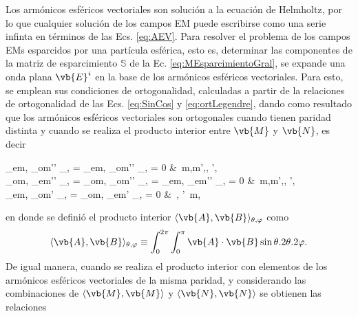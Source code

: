 Los armónicos esféricos vectoriales son solución a la ecuación de Helmholtz, por lo que cualquier solución de los campos EM puede escribirse como una serie infinta en términos de las Ecs. \eqref{eq:AEV}. Para resolver el problema de los campos EMs esparcidos por una partícula esférica, esto es, determinar las componentes de la matriz de esparcimiento $\mathbb{S}$ de la Ec. \eqref{eq:MEsparcimientoGral}, se expande una onda plana $\vb{E}^i$ en la base de los armónicos esféricos vectoriales. Para esto, se emplean sus  condiciones de ortogonalidad, calculadas a partir de la relaciones de ortogonalidad de las Ecs. \eqref{eq:SinCos} y \eqref{eq:ortLegendre}, dando como resultado que los armónicos esféricos vectoriales son ortogonales cuando tienen paridad distinta y cuando se realiza el producto interior entre $\vb{M}$ y $\vb{N}$, es decir \vspace{-.5em}
%
	\begin{tcolorbox}
		\langle{}_{em\ell}, _{om'\ell'} \rangle_{\theta,\varphi} =
		\langle{}_{em\ell}, _{om'\ell'} \rangle_{\theta,\varphi} = 0
		&\qquad \forall\,  m,m',\ell, \ell',\\
		\langle{}_{om\ell}, _{em'\ell'} \rangle_{\theta,\varphi} = 
		\langle{}_{om\ell}, _{om'\ell'} \rangle_{\theta,\varphi} = 	
		\langle{}_{em\ell}, _{em'\ell'} \rangle_{\theta,\varphi} = 0
		&\qquad \forall\,  m,m',\ell, \ell',	\\
		\langle{}_{em\ell},  _{om\ell'} \rangle_{\theta,\varphi} =
		\langle{}_{om\ell},  _{em\ell'} \rangle_{\theta,\varphi} = 0	
		&\qquad \forall\, \ell, \ell'\, m,
	\end{tcolorbox}\vspace{-.5em}\noindent
en donde se definió el producto interior $\langle \vb{A},\vb{B} \rangle_{\theta,\varphi}$ como 
	\begin{align*}
	\langle \vb{A},\vb{B} \rangle_{\theta,\varphi} 
	\equiv 
	\int_0^{2\pi}\int_0^\pi \vb{A}\cdot\vb{B} \sin\theta \dd\theta \dd\varphi.
	\end{align*}
De igual manera, cuando se realiza el producto interior con elementos de los armónicos esféricos vectoriales de la misma paridad, y considerando las combinaciones de  $\langle \vb{M},\vb{M}\rangle$ y $\langle \vb{N},\vb{N}\rangle$  se obtienen las relaciones \vspace{-.5em}
